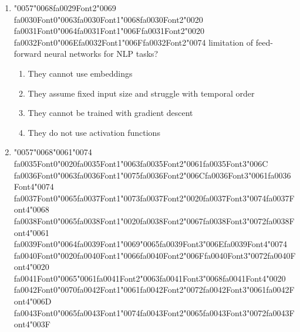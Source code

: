 \documentclass[12pt]{article}
\begin{document}
\begin{enumerate}[label=Q\arabic*.]
\begin{enumerate}[label=(\Alph*)]
    \item To prevent the gradients from exploding
    \item To increase the speed of the training process
    \item To allow the model to handle variable-length sequences
\end{enumerate}
\item {\char"0057}{\char"0068}{\csname fa0029Font2\endcsname\char"0069} {\csname fa0030Font0\endcsname\char"0063}{\csname fa0030Font1\endcsname\char"0068}{\csname fa0030Font2\endcsname\char"0020} {\csname fa0031Font0\endcsname\char"0064}{\csname fa0031Font1\endcsname\char"006F}{\csname fa0031Font2\endcsname\char"0020} {\csname fa0032Font0\endcsname\char"006E}{\csname fa0032Font1\endcsname\char"006F}{\csname fa0032Font2\endcsname\char"0074} limitation of feed-forward neural networks for NLP tasks?
\begin{enumerate}[label=(\Alph*)]
    \item They cannot use embeddings
    \item They assume fixed input size and struggle with temporal order
    \item They cannot be trained with gradient descent
    \item They do not use activation functions
\end{enumerate}
\item {\char"0057}{\char"0068}{\char"0061}{\char"0074} {\csname fa0035Font0\endcsname\char"0020}{\csname fa0035Font1\endcsname\char"0063}{\csname fa0035Font2\endcsname\char"0061}{\csname fa0035Font3\endcsname\char"006C} {\csname fa0036Font0\endcsname\char"0063}{\csname fa0036Font1\endcsname\char"0075}{\csname fa0036Font2\endcsname\char"006C}{\csname fa0036Font3\endcsname\char"0061}{\csname fa0036Font4\endcsname\char"0074} {\csname fa0037Font0\endcsname\char"0065}{\csname fa0037Font1\endcsname\char"0073}{\csname fa0037Font2\endcsname\char"0020}{\csname fa0037Font3\endcsname\char"0074}{\csname fa0037Font4\endcsname\char"0068} {\csname fa0038Font0\endcsname\char"0065}{\csname fa0038Font1\endcsname\char"0020}{\csname fa0038Font2\endcsname\char"0067}{\csname fa0038Font3\endcsname\char"0072}{\csname fa0038Font4\endcsname\char"0061} {\csname fa0039Font0\endcsname\char"0064}{\csname fa0039Font1\endcsname\char"0069}{\char"0065}{\csname fa0039Font3\endcsname\char"006E}{\csname fa0039Font4\endcsname\char"0074} {\csname fa0040Font0\endcsname\char"0020}{\csname fa0040Font1\endcsname\char"0066}{\csname fa0040Font2\endcsname\char"006F}{\csname fa0040Font3\endcsname\char"0072}{\csname fa0040Font4\endcsname\char"0020} {\csname fa0041Font0\endcsname\char"0065}{\char"0061}{\csname fa0041Font2\endcsname\char"0063}{\csname fa0041Font3\endcsname\char"0068}{\csname fa0041Font4\endcsname\char"0020} {\csname fa0042Font0\endcsname\char"0070}{\csname fa0042Font1\endcsname\char"0061}{\csname fa0042Font2\endcsname\char"0072}{\csname fa0042Font3\endcsname\char"0061}{\csname fa0042Font4\endcsname\char"006D} {\csname fa0043Font0\endcsname\char"0065}{\csname fa0043Font1\endcsname\char"0074}{\csname fa0043Font2\endcsname\char"0065}{\csname fa0043Font3\endcsname\char"0072}{\csname fa0043Font4\endcsname\char"003F}

\end{enumerate}
\end{document}
